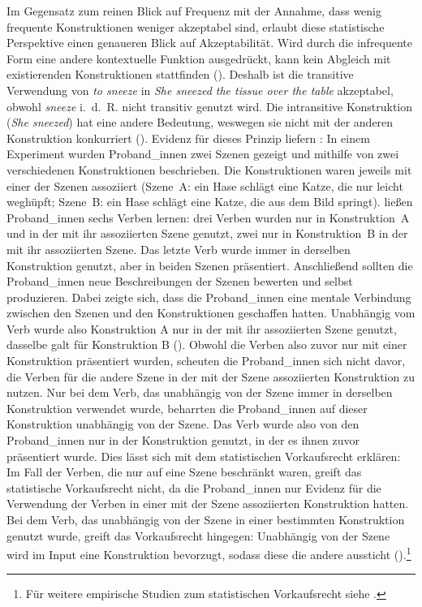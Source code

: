 Im Gegensatz zum reinen Blick auf Frequenz mit der Annahme, dass wenig frequente Konstruktionen weniger akzeptabel sind, erlaubt diese statistische Perspektive einen genaueren Blick auf Akzeptabilität. Wird durch die infrequente Form eine andere kontextuelle Funk\-tion ausgedrückt, kann kein Abgleich mit existierenden Konstruktionen stattfinden (\cite[75--76]{Goldberg.2019}). Deshalb ist die transitive Verwendung von \textit{to sneeze} in \textit{She sneezed the tissue over the table} akzeptabel, obwohl \textit{sneeze} i.~d.~R. nicht transitiv genutzt wird. Die intransitive Konstruktion (\textit{She sneezed}) hat eine andere Bedeutung, weswegen sie nicht mit der anderen Konstruktion konkurriert (\cite[76]{Goldberg.2019}). Evidenz für dieses Prinzip liefern \textcite{Perek.2017}: In einem Experiment wurden Proband\_innen zwei Szenen gezeigt und mithilfe von zwei verschiedenen Konstruktionen beschrieben. Die Konstruktionen waren jeweils mit einer der Szenen assoziiert (Szene~A: ein Hase schlägt eine Katze, die nur leicht weghüpft; Szene~B: ein Hase schlägt eine Katze, die aus dem Bild springt). \textcite[283--286]{Perek.2017} ließen Proband\_innen sechs Verben lernen: drei Verben wurden nur in Konstruktion~A und in der mit ihr assoziierten Szene genutzt, zwei nur in Konstruktion~B in der mit ihr assoziierten Szene. Das letzte Verb wurde immer in derselben Konstruktion genutzt, aber in beiden Szenen präsentiert. Anschließend sollten die Proband\_innen neue Beschreibungen der Szenen bewerten und selbst produzieren. Dabei zeigte sich, dass die Proband\_innen eine mentale Verbindung zwischen den Szenen und den Konstruktionen geschaffen hatten. Unabhängig vom Verb wurde also Konstruktion A nur in der mit ihr assoziierten Szene genutzt, dasselbe galt für Konstruktion B (\cite[286--312]{Perek.2017}). Obwohl die Verben also zuvor nur mit einer Konstruktion präsentiert wurden, scheuten die Proband\_innen sich nicht davor, die Verben für die andere Szene in der mit der Szene assoziierten Konstruktion zu nutzen. Nur bei dem Verb, das unabhängig von der Szene immer in derselben Konstruktion verwendet wurde, beharrten die Proband\_innen auf dieser Konstruktion unabhängig von der Szene.  Das Verb wurde also von den Proband\_innen nur in der Konstruktion genutzt, in der es ihnen zuvor präsentiert wurde. Dies lässt sich mit dem statistischen Vorkaufsrecht erklären: Im Fall der Verben, die nur auf eine Szene beschränkt waren, greift das statistische Vorkaufsrecht nicht, da die Proband\_innen nur Evidenz für die Verwendung der Verben in einer mit der Szene assoziierten Konstruktion hatten.  Bei dem Verb, das unabhängig von der Szene in einer bestimmten Konstruktion genutzt wurde, greift das Vorkaufsrecht hingegen: Unabhängig von der Szene wird im Input eine Konstruktion bevorzugt, sodass diese die andere aussticht (\cite[286--312]{Perek.2017}).\footnote{Für weitere empirische Studien zum statistischen Vorkaufsrecht siehe \textcite[77--84]{Goldberg.2019}.}  

